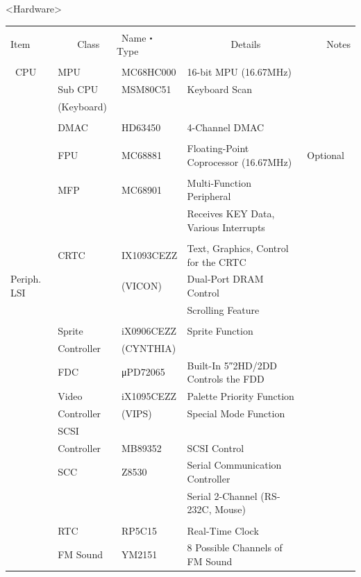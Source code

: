 \documentclass[twoside,a4paper,12pt]{article}
\begin{document}
<Hardware>

\setlength{\tabcolsep}{0.5mm}
\begin{tabular}{|p{13mm}|p{25mm}|p{22mm}|p{73mm}|p{30mm}|}
\hline
& & & &\\[-2mm]
Item & \ \ \ \ Class & \ Name・Type & \ \ \ \ \ \ \ \ \ Details & \ \ \ \ Notes\\
\hline
& & & &\\[-3mm]
\ CPU & MPU & \ MC68HC000 & 16-bit MPU (16.67MHz) &\\
& Sub CPU & \ MSM80C51 & Keyboard Scan &\\
& (Keyboard) & & &\\
\hline
\multirow{19}{13mm}{Periph. LSI} & & & &\\[-3mm]
& DMAC & \ HD63450 & 4-Channel DMAC &\\
\cline{2-5}
& & & &\\[-3mm]
& FPU & \ MC68881 & Floating-Point Coprocessor (16.67MHz) & Optional\\
\cline{2-5}
& & & &\\[-3mm]
& MFP & \ MC68901 & Multi-Function Peripheral &\\
& & & Receives KEY Data, Various Interrupts &\\
\cline{2-5}
& & & &\\[-3mm]
& CRTC & \ IX1093CEZZ & Text, Graphics, Control for the CRTC &\\
& & \ (VICON) & Dual-Port DRAM Control &\\
& & & Scrolling Feature &\\[3mm]
\cline{2-5}
& & & &\\[-1mm]
& Sprite & \ iX0906CEZZ & Sprite Function &\\
& Controller & \ (CYNTHIA) & &\\
& FDC & \ μPD72065 & Built-In 5″2HD/2DD Controls the FDD &\\
& Video & \ iX1095CEZZ & Palette Priority Function &\\
& Controller & \ (VIPS) & Special Mode Function &\\
& SCSI & & &\\
& Controller & \ MB89352 & SCSI Control &\\
& SCC & \ Z8530 & Serial Communication Controller &\\
& & & Serial 2-Channel (RS-232C, Mouse) &\\
& & & &\\
& RTC & \ RP5C15 & Real-Time Clock &\\
& FM Sound & \ YM2151 & 8 Possible Channels of FM Sound &\\

\end{tabular}
\end{document}

